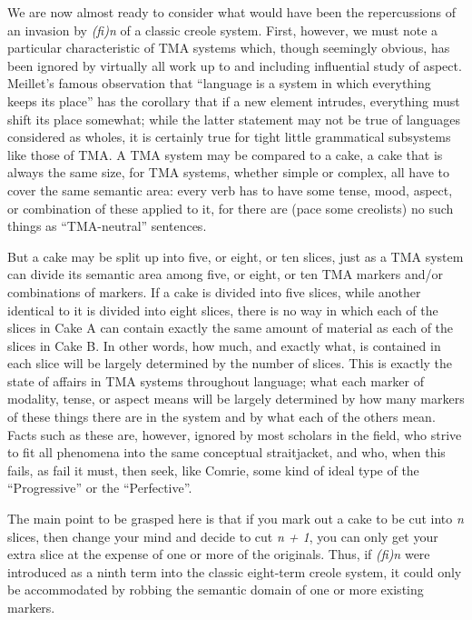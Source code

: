 We are now almost ready to consider what would have been the repercussions of an invasion by \textit{(fi)n} of a classic creole system. First, however, we must note a particular characteristic of TMA systems which, though seemingly obvious, has been ignored by virtually all work up to and including  influential study of aspect. Meillet's famous observation that ``language is a system in which every\-thing keeps its place'' has the corollary that if a new element intrudes, everything must shift its place somewhat; while the latter statement may not be true of languages considered as wholes, it is certainly true for tight little grammatical subsystems like those of TMA. A TMA system may be compared to a cake, a cake that is always the same size, for TMA systems, whether simple or complex, all have to cover the same semantic area: every verb has to have some tense, mood, aspect, or combination of these applied to it, for there are (pace some creolists) no such things as ``TMA-neutral'' sentences.

But a cake may be split up into five, or eight, or ten slices, just as a TMA system can divide its semantic area among five, or eight, or ten TMA markers and/or combinations of markers. If a cake is divided into five slices, while another identical to it is divided into eight slices, there is no way in which each of the slices in Cake A can contain exactly the same amount of material as each of the slices in Cake B. In other words, how much, and exactly what, is contained in each slice will be largely determined by the number of slices. This is exactly the state of affairs in TMA systems throughout language; what each marker of modality, tense, or aspect means will be largely determined by how many markers of these things there are in the system and by what each of the others mean. Facts such as these are, however, ignored by most scholars in the field, who strive to fit all phenomena into the same conceptual straitjacket, and who, when
this fails, as fail it must, then seek, like Comrie, some kind of ideal type of the ``Progressive'' or the ``Perfective''.

The main point to be grasped here is that if you mark out a cake to be cut into \textit{n} slices, then change your mind and decide to cut \textit{n + 1}, you can only get your extra slice at the expense of one or more of the originals. Thus, if \textit{(fi)n} were introduced as a ninth term into the classic eight-term creole system, it could only be accommodated by robbing the semantic domain of one or more existing markers.

